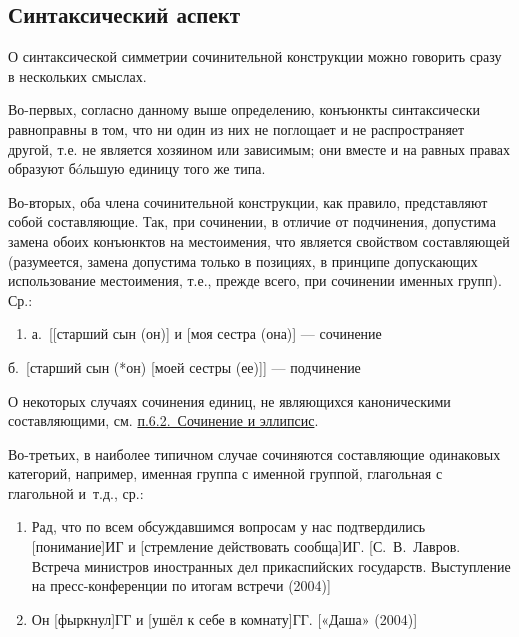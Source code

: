 \subsection{Синтаксический
  аспект}\label{ux441ux438ux43dux442ux430ux43aux441ux438ux447ux435ux441ux43aux438ux439-ux430ux441ux43fux435ux43aux442}

О синтаксической симметрии сочинительной конструкции можно говорить
сразу в нескольких смыслах.

Во-первых, согласно данному выше определению, конъюнкты синтаксически
равноправны в том, что ни один из них не поглощает и не распространяет
другой, т.е. не является хозяином или зависимым; они вместе и на равных
правах образуют бóльшую единицу того же типа.

Во-вторых, оба члена сочинительной конструкции, как правило,
представляют собой составляющие. Так, при сочинении, в отличие от
подчинения, допустима замена обоих конъюнктов на местоимения, что
является свойством составляющей (разумеется, замена допустима только в
позициях, в принципе допускающих использование местоимения, т.е., прежде
всего, при сочинении именных групп). Ср.:

\begin{enumerate}
  \def\labelenumi{(\arabic{enumi})}
  \setcounter{enumi}{9}
  \item
        а.~{[}{[}старший сын (он){]} и {[}моя сестра (она){]} --- сочинение
\end{enumerate}

б.~{[}старший сын (*он) {[}моей сестры (ее){]}{]} --- подчинение

О некоторых случаях сочинения единиц, не являющихся каноническими
составляющими, см. \underline{п.6.2.~Сочинение и эллипсис}.

Во-третьих, в наиболее типичном случае сочиняются составляющие
одинаковых категорий, например, именная группа с именной группой,
глагольная с глагольной и~т.д., ср.:

\begin{enumerate}
  \def\labelenumi{(\arabic{enumi})}
  \setcounter{enumi}{10}
  \item
        Рад, что по всем обсуждавшимся вопросам у нас подтвердились
        {[}понимание{]}ИГ и {[}стремление действовать сообща{]}ИГ.
        {[}С.~В.~Лавров. Встреча министров иностранных дел прикаспийских
        государств. Выступление на пресс-конференции по итогам встречи
        (2004){]}
  \item
        Он {[}фыркнул{]}ГГ и {[}ушёл к себе в комнату{]}ГГ. {[}«Даша»
        (2004){]}
\end{enumerate}

